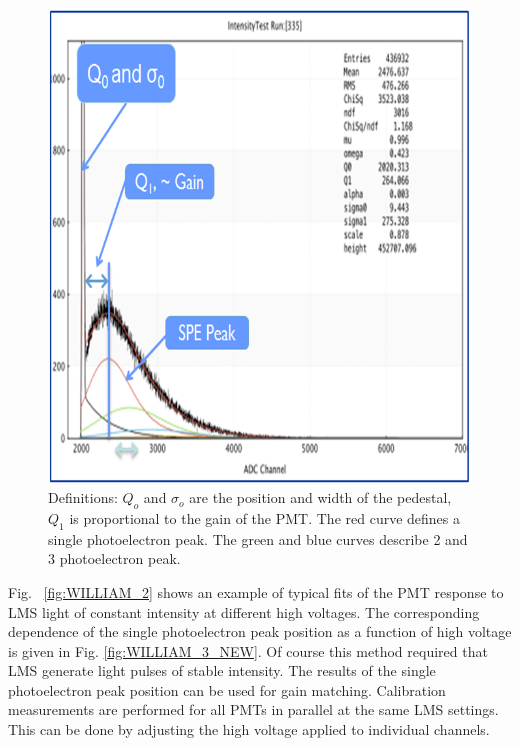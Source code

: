 \begin{figure}[!h]
    \centering
    \includegraphics[width=1.0\linewidth,trim={0.0cm 0.0cm 0.0cm 0.0cm},clip]{images/WILLIAM_1.png}
    \caption{Definitions: $Q_{o}$ and $\sigma_{o}$ are the position and width of the pedestal, $Q_{ 1}$ is proportional to the gain of the PMT. The red curve defines a single photoelectron peak. The green and blue curves describe 2 and 3 photoelectron peak.}
    \label{fig:WILLIAM_1}
\end{figure}

Fig. ~\ref{fig:WILLIAM_2} shows an example of typical fits of the PMT response to LMS light of constant intensity at different high voltages. The corresponding dependence of the single photoelectron peak position as a function of high voltage is given in Fig. \ref{fig:WILLIAM_3_NEW}. Of course this method required that LMS generate light pulses of stable intensity. The results of the single photoelectron peak position can be used for gain matching. Calibration measurements are performed for all PMTs in parallel at the same LMS settings. This can be done by adjusting the high voltage applied to individual channels.


